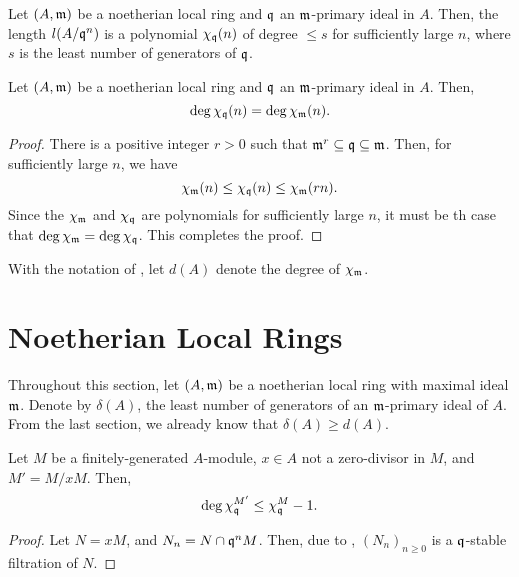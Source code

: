 \begin{corollary}
    Let $(A,\mathfrak m)$ be a noetherian local ring and $\mathfrak q$ an $\mathfrak m$-primary ideal in $A$. Then, the length $l(A/\mathfrak q^n)$ is a polynomial $\chi_\mathfrak q(n)$ of degree $\le s$ for sufficiently large $n$, where $s$ is the least number of generators of $\mathfrak q$.
\end{corollary}

\begin{proposition}
    Let $(A,\mathfrak m)$ be a noetherian local ring and $\mathfrak q$ an $\mathfrak m$-primary ideal in $A$. Then, 
    \begin{equation*}
        \deg\chi_\mathfrak q(n) = \deg\chi_\mathfrak m(n).
    \end{equation*}
\end{proposition}
\begin{proof}
    There is a positive integer $r > 0$ such that $\mathfrak m^r\subseteq\mathfrak q\subseteq\mathfrak m$. Then, for sufficiently large $n$, we have 
    \begin{equation*}
        \chi_\mathfrak m(n)\le\chi_\mathfrak q(n)\le\chi_\mathfrak m(rn).
    \end{equation*}
    Since the $\chi_\mathfrak m$ and $\chi_\mathfrak q$ are polynomials for sufficiently large $n$, it must be th case that $\deg\chi_\mathfrak m = \deg\chi_\mathfrak q$. This completes the proof.
\end{proof}

\begin{definition}
    With the notation of , let $d(A)$ denote the degree of $\chi_\mathfrak m$.
\end{definition}

\section{Noetherian Local Rings}

Throughout this section, let $(A,\mathfrak m)$ be a noetherian local ring with maximal ideal $\mathfrak m$. Denote by $\delta(A)$, the least number of generators of an $\mathfrak m$-primary ideal of $A$. From the last section, we already know that $\delta(A)\ge d(A)$.

\begin{lemma}
    Let $M$ be a finitely-generated $A$-module, $x\in A$ not a zero-divisor in $M$, and $M' = M/xM$. Then, 
    \begin{equation*}
        \deg\chi_\mathfrak q^{M'}\le\chi_\mathfrak q^{M} - 1.
    \end{equation*}
\end{lemma}
\begin{proof}
    Let $N = xM$, and $N_n = N\cap\mathfrak q^n M$. Then, due to , $(N_n)_{n\ge 0}$ is a $\mathfrak q$-stable filtration of $N$. 
\end{proof}

